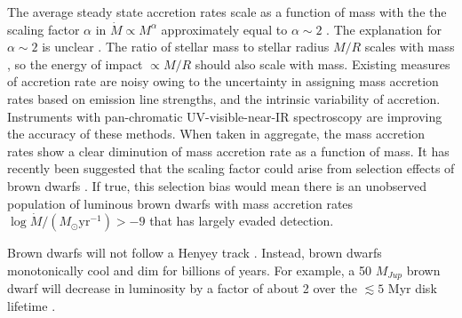 The average steady state accretion rates scale as a function of mass with the the scaling factor $\alpha$ in $\dot{M}\propto M^\alpha$ approximately equal to $\alpha \sim 2$ \citep{2008A&A...481..423G,2006ApJ...639L..83A,2006A&A...452..245N,2009ApJ...696.1589H}.  The explanation for $\alpha \sim 2$ is unclear \citep{2006ApJ...648..484H}.  The ratio of stellar mass to stellar radius $M/R$ scales with mass \citep{2009AIPC.1094..102C}, so the energy of impact $\propto M/R$ should also scale with mass.  Existing measures of accretion rate are noisy owing to the uncertainty in assigning mass accretion rates based on emission line strengths, and the intrinsic variability of accretion.  Instruments with pan-chromatic UV-visible-near-IR spectroscopy \citep{2011A&A...536A.105V,2012A&A...548A..56R} are improving the accuracy of these methods.  When taken in aggregate, the mass accretion rates show a clear diminution of mass accretion rate as a function of mass.  It has recently been suggested that the scaling factor could arise from selection effects of brown dwarfs \citep{2010MNRAS.409.1307M}.  If true, this selection bias would mean there is an unobserved population of luminous brown dwarfs with mass accretion rates $\log{\dot{M}/(M_{\odot}\mathrm{yr}^{-1})} >-9$ that has largely evaded detection.

Brown dwarfs will not follow a Henyey track \citep{1959ApJ...129....2H}.  Instead, brown dwarfs monotonically cool and dim for billions of years.  For example, a 50 $M_{Jup}$ brown dwarf will decrease in luminosity by a factor of about 2 over the $\lesssim5$ Myr disk lifetime \citep{2002A&A...382..563B}.

